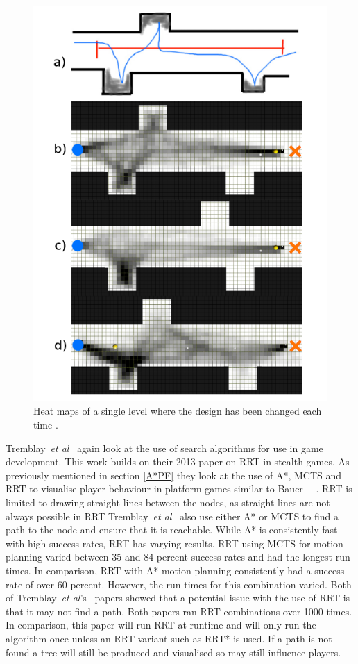 \documentclass[journal]{IEEEtran}
\begin{document}
\begin{figure}[h]
	\includegraphics[width=1.0\linewidth]{TremblayHeatMap.png}
	\caption{Heat maps of a single level where the design has been changed each time \cite{Tremblay2013}.}
	\label{TremblayHeatMap}
\end{figure} 

Tremblay~\textit{et al}~\cite{Tremblay2014} again look at the use of search algorithms for use in game development. This work builds on their 2013 paper on RRT in stealth games. As previously mentioned in section \ref{A*PF} they look at the use of A*, MCTS and RRT to visualise player behaviour in platform games similar to Bauer ~\cite{Tremblay2014}~\cite{bauer2012}.  RRT is limited to drawing straight lines between the nodes, as straight lines are not always possible in RRT Tremblay~\textit{et al}~\cite{Tremblay2014} also use either A* or MCTS to find a path to the node and ensure that it is reachable.
While A* is consistently fast with high success rates, RRT has varying results. RRT using MCTS for motion planning varied between 35 and 84 percent success rates and had the longest run times. In comparison, RRT with A* motion planning consistently had a success rate of over 60 percent. However, the run times for this combination varied. 
Both of Tremblay~\textit{et al}'s~\cite{Tremblay2014, Tremblay2013} papers showed that a potential issue with the use of RRT is that it may not find a path. Both papers ran RRT combinations over 1000 times. In comparison, this paper will run RRT at runtime and will only run the algorithm once unless an RRT variant such as RRT* is used. If a path is not found a tree will still be produced and visualised so may still influence players.
\end{document}
